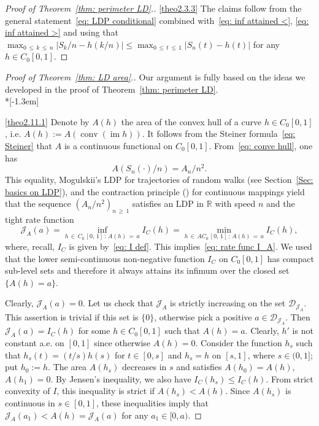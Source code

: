 \documentclass[10pt]{amsart}
\theoremstyle{definition}\newtheorem{defi}[theo]{Definition}\newtheorem{rema}[theo]{Remark}\newtheorem{exam}[theo]{Example}\newtheorem{exem}[theo]{Example}\newtheorem{nota}[theo]{Notation}
\DeclareMathOperator{\conv}{conv}
\DeclareMathOperator{\im}{im}
\newcommand{\Rbb}{\mathbb{R}}
\newcommand{\Dcl}{\mathcal{D}}
\newcommand{\Jcl}{\mathcal{J}}
\begin{document}
\begin{proof}[Proof of Theorem~\ref{thm: perimeter LD}.]
\eqref{theo2.3.3} The claims follow from the general statement~\eqref{eq: LDP conditional} combined with~\eqref{eq: inf attained <}, \eqref{eq: inf attained >} and using that $\max_{0\,\le\,k\,\le \,n} | S_k/n - h(k/n) | \le \max_{0\,\le\,t\,\le\,1} |S_n(t) - h(t)|$ for any $h \in C_0[0,1]$.\qedhere
\end{proof}

\goodbreak
\begin{proof}[Proof of Theorem~\ref{thm: LD area}.]
Our argument is fully based on the ideas we developed in the proof of Theorem~\ref{thm: perimeter LD}.\ \\*[-1.3em]

\eqref{theo2.11.1} Denote by $A(h)$ the area of the convex hull of a curve $h \in C_0[0,1]$, i.e. $A(h):= A(\conv(\im h))$. It follows from the Steiner formula~\eqref{eq: Steiner} that $A$ is a continuous functional on $C_0[0,1]$. From~\eqref{eq: conve hull}, one has
\[
A(S_n(\cdot)/n)= A_n/n^2.
\]
This equality, Mogulskii's LDP for trajectories of random walks (see Section~\ref{Sec: basics on LDP}), and the contraction principle (\cite[Theorem~4.2.1]{DemboZeitouni}) for continuous mappings yield that the sequence $(A_n/n^2)_{n\,\ge\,1}$ satisfies an LDP in $\Rbb$ with speed $n$ and the tight rate function
\begin{equation}\label{eq: rate function I_A}
\Jcl_A(a)=\inf_{h\,\in\,C_0\,[0,\,1]\,: \, A(h)\,=\,a} I_C(h) = \min_{h\,\in\,AC_0\,[0,\,1]\,:\, A(h)\,=\,a} I_C(h),
\end{equation}
where, recall, $I_C$ is given by~\eqref{eq: I def}. This implies~\eqref{eq: rate func I_A}. We used that the lower semi-continuous non-negative function $I_C$ on $C_0[0,1]$ has compact sub-level sets and therefore it always attains its infimum over the closed set $\{A(h)=a\}$.

Clearly, $\Jcl_A(a)=0$. Let us check that $\Jcl_A$ is strictly increasing on the set $\Dcl_{\Jcl_A}$. This assertion is trivial if this set is $\{0\}$, otherwise pick a positive $a \in \Dcl_{\Jcl_A}$. Then $\Jcl_A(a)=I_C(h)$ for some $h \in C_0[0,1]$ such that $A(h)=a$. Clearly, $h'$ is not constant a.e. on $[0,1]$ since otherwise $A(h)=0$. Consider the function $h_s$ such that $h_s(t)=(t/s)h(s) $ for $t \in [0,s]$ and $h_s=h$ on $[s,1]$, where $s \in (0,1]$; put $h_0:=h$. The area $A(h_s)$ decreases in $s$ and satisfies $A(h_0)=A(h)$, $A(h_1)=0$. By Jensen's inequality, we also have $I_C(h_s) \le I_C(h)$. From strict convexity of $I$, this inequality is strict if $A(h_s) < A(h)$. Since $A(h_s)$ is continuous in $s \in [0,1]$, these inequalities imply that $\Jcl_A(a_1) < A(h) =\Jcl_A(a)$ for any $a_1 \in [0, a)$.


\end{proof}
\end{document}

